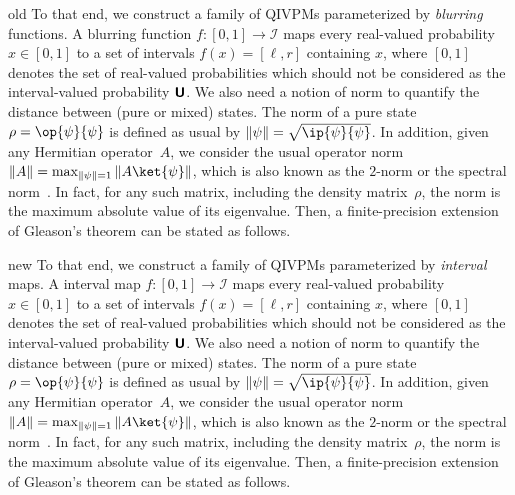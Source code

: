 \documentclass[english,reprint, aps, prl,superscriptaddress, showpacs,
showkeys, longbibliography, amsmath, amssymb, floatfix]{revtex4-1}
\theoremstyle{plain}
\theoremstyle{definition}
\newcommand{\interval}[1]{{\normalfont\textsf{\textbf{#1}}}}
\newcommand{\unknown}{\interval{U}}
\newcommand{\proj}[1]{\op{#1}{#1}}
\newcommand{\says}[3]{\begin{framed}\begin{minipage}{0.9\linewidth}\color{#1}{#2 says: #3}\end{minipage}\end{framed}}
\newcommand{\andy}[1]{\says{blue}{Andy}{#1}}
\newenvironment{compare}{\begin{widetext}\end{widetext}}{\begin{widetext}\end{widetext}}
\newenvironment{oldText}[1]{\begin{compareText}{#1}{old}}{\end{compareText}\newpage}
\newenvironment{newText}[1]{\begin{compareText}{#1}{new}}{\end{compareText}}
\begin{document}
\begin{compare}
\begin{oldText}{\andy}
To that end, we construct a family of QIVPMs parameterized by {\color{blue}\emph{blurring}
functions. A blurring function} $f:\left[0,1\right]\rightarrow\mathscr{I}$
maps every real-valued probability $x\in\left[0,1\right]$ to a set
of intervals $f\left(x\right)=\left[\ell,r\right]$ containing $x$,
where $\left[0,1\right]$ denotes the set of real-valued probabilities
which should not be considered as the interval-valued probability
$\unknown$. We also need a notion of norm to quantify the
distance between (pure or mixed) states. The norm of a pure state
$\rho=\proj{\psi}$ is defined as usual by $\left\Vert \psi\right\Vert =\sqrt{\ip{\psi}{\psi}}$.
In addition, given any Hermitian operator~$A$, we consider the usual
operator norm $\left\Vert A\right\Vert =\max_{\left\Vert \psi\right\Vert =1}\left\Vert A\ket{\psi}\right\Vert $,
which is also known as the $2$-norm or the spectral norm~\cite{RobertsVarberg1973,peres1995quantum,GolubVanLoan1996,Foucart2012}.
In fact, for any such matrix, including the density matrix~$\rho$,
the norm is the maximum absolute value of its eigenvalue. Then, a
finite-precision extension of Gleason's theorem can be stated as follows.
\end{oldText}
\begin{newText}{\andy}
To that end, we construct a family of QIVPMs parameterized by {\color{blue}\emph{interval}
maps. A interval map} $f:\left[0,1\right]\rightarrow\mathscr{I}$
maps every real-valued probability $x\in\left[0,1\right]$ to a set
of intervals $f\left(x\right)=\left[\ell,r\right]$ containing $x$,
where $\left[0,1\right]$ denotes the set of real-valued probabilities
which should not be considered as the interval-valued probability
$\unknown$. We also need a notion of norm to quantify the
distance between (pure or mixed) states. The norm of a pure state
$\rho=\proj{\psi}$ is defined as usual by $\left\Vert \psi\right\Vert =\sqrt{\ip{\psi}{\psi}}$.
In addition, given any Hermitian operator~$A$, we consider the usual
operator norm $\left\Vert A\right\Vert =\max_{\left\Vert \psi\right\Vert =1}\left\Vert A\ket{\psi}\right\Vert $,
which is also known as the $2$-norm or the spectral norm~\cite{RobertsVarberg1973,peres1995quantum,GolubVanLoan1996,Foucart2012}.
In fact, for any such matrix, including the density matrix~$\rho$,
the norm is the maximum absolute value of its eigenvalue. Then, a
finite-precision extension of Gleason's theorem can be stated as follows.
\end{newText}
\end{compare}
\end{document}
